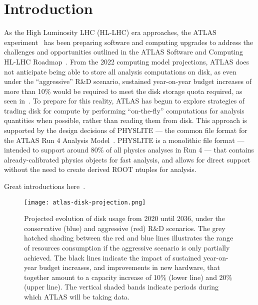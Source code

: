 \section{Introduction}\label{sec:introduction}

As the High Luminosity LHC (HL-LHC) era approaches, the ATLAS experiment~\cite{PERF-2007-01} has been preparing software and computing upgrades to address the challenges and opportunities outlined in the ATLAS Software and Computing HL-LHC Roadmap~\cite{CERN-LHCC-2022-005}.
From the 2022 computing model projections, ATLAS does not anticipate being able to store all analysis computations on disk, as even under the ``aggressive'' R\&D scenario, sustained year-on-year budget increases of more than 10\% would be required to meet the disk storage quota required, as seen in~.
To prepare for this reality, ATLAS has begun to explore strategies of trading disk for compute by performing ``on-the-fly'' computations for analysis quantities when possible, rather than reading them from disk.
This approach is supported by the design decisions of PHYSLITE --- the common file format for the ATLAS Run 4 Analysis Model~\cite{Schaarschmidt:2024vzr}.
PHYSLITE is a monolithic file format --- intended to support around 80\% of all physics analyses in Run 4 --- that contains already-calibrated physics objects for fast analysis, and allows for direct support without the need to create derived ROOT ntuples for analysis.


Great introductions here~\cite{CERN-LHCC-2022-005,nanobind}.

\begin{figure}
    \centering
    \texttt{[image: atlas-disk-projection.png]}
    \caption{Projected evolution of disk usage from 2020 until 2036, under the conservative (blue) and aggressive (red) R\&D scenarios.
The grey hatched shading between the red and blue lines illustrates the range of resources consumption if the aggressive scenario is only partially achieved.
The black lines indicate the impact of sustained year-on-year budget increases, and improvements in new hardware, that together amount to a capacity increase of 10\% (lower line) and 20\% (upper line).
The vertical shaded bands indicate periods during which ATLAS will be taking data.~\cite{CERN-LHCC-2022-005}}
    \label{fig:atlas-disk-projection}
\end{figure}
